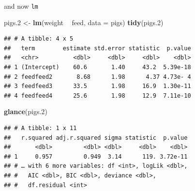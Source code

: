 \documentclass[
  ignorenonframetext,
]{beamer}
\newenvironment{Shaded}{\begin{snugshade}}{\end{snugshade}}
\newcommand{\DataTypeTok}[1]{\textcolor[rgb]{0.13,0.29,0.53}{#1}}
\newcommand{\FloatTok}[1]{\textcolor[rgb]{0.00,0.00,0.81}{#1}}
\newcommand{\KeywordTok}[1]{\textcolor[rgb]{0.13,0.29,0.53}{\textbf{#1}}}
\newcommand{\NormalTok}[1]{#1}
\newcommand{\OperatorTok}[1]{\textcolor[rgb]{0.81,0.36,0.00}{\textbf{#1}}}
\newcommand{\StringTok}[1]{\textcolor[rgb]{0.31,0.60,0.02}{#1}}
\begin{document}
\begin{frame}[fragile]{and now \texttt{lm}}
\protect\hypertarget{and-now-lm}{}

\footnotesize

\begin{Shaded}
\begin{Highlighting}[]
\NormalTok{pigs}\FloatTok{.2}\NormalTok{ <-}\StringTok{ }\KeywordTok{lm}\NormalTok{(weight }\OperatorTok{~}\StringTok{ }\NormalTok{feed, }\DataTypeTok{data =}\NormalTok{ pigs)}
\KeywordTok{tidy}\NormalTok{(pigs}\FloatTok{.2}\NormalTok{)}
\end{Highlighting}
\end{Shaded}

\begin{verbatim}
## # A tibble: 4 x 5
##   term        estimate std.error statistic  p.value
##   <chr>          <dbl>     <dbl>     <dbl>    <dbl>
## 1 (Intercept)    60.6       1.40     43.2  5.39e-18
## 2 feedfeed2       8.68      1.98      4.37 4.73e- 4
## 3 feedfeed3      33.5       1.98     16.9  1.30e-11
## 4 feedfeed4      25.6       1.98     12.9  7.11e-10
\end{verbatim}

\begin{Shaded}
\begin{Highlighting}[]
\KeywordTok{glance}\NormalTok{(pigs}\FloatTok{.2}\NormalTok{)}
\end{Highlighting}
\end{Shaded}

\begin{verbatim}
## # A tibble: 1 x 11
##   r.squared adj.r.squared sigma statistic  p.value
##       <dbl>         <dbl> <dbl>     <dbl>    <dbl>
## 1     0.957         0.949  3.14      119. 3.72e-11
## # … with 6 more variables: df <int>, logLik <dbl>,
## #   AIC <dbl>, BIC <dbl>, deviance <dbl>,
## #   df.residual <int>
\end{verbatim}

\normalsize

\end{frame}
\end{document}
